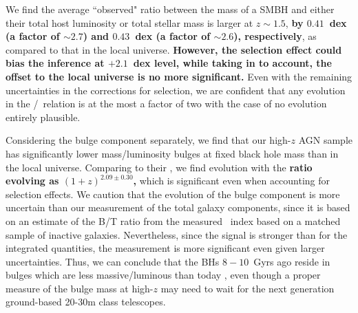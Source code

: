 \documentclass[apj]{emulateapj}
\begin{document}
We find the average ``observed" ratio between the mass of a SMBH and either their total host luminosity or total stellar mass is larger at $z\sim1.5$, {\bf by $0.41$~dex (a factor of $\sim2.7$) and  $0.43$~dex (a factor of $\sim2.6$), respectively}, as compared to that in the local universe. 
{\bf However, the selection effect could bias the inference at $+2.1$~dex level, while taking in to account, the offset to the local universe is no more significant.} 
Even with the remaining uncertainties in the corrections for selection, we are confident that any evolution in the \mbh/\smass\ relation is at the most a factor of two with the case of no evolution entirely plausible.

Considering the bulge component \citep{Bennert11, Woo++08} separately, we find that our high-$z$ AGN sample has significantly lower mass/luminosity bulges at fixed black hole mass than in the local universe. Comparing to their \mbh, we find evolution with the {\bf ratio evolving as $(1+z)^{2.09\pm0.30}$,} which is significant even when accounting for selection effects. We caution that the evolution of the bulge component is more uncertain than our measurement of the total galaxy components, since it is based on an estimate of the B/T ratio from the measured \sersic\ index based on a matched sample of inactive galaxies. Nevertheless, since the signal is stronger than for the integrated quantities, the measurement is more significant even given larger uncertainties.
Thus, we can conclude that the BHs $8-10$~Gyrs ago reside in bulges which are less massive/luminous than today \citep[see also][]{Bennert11,Park15}, even though a proper measure of the bulge mass at high-$z$ may need to wait for the next generation ground-based 20-30m class telescopes.
\end{document}
